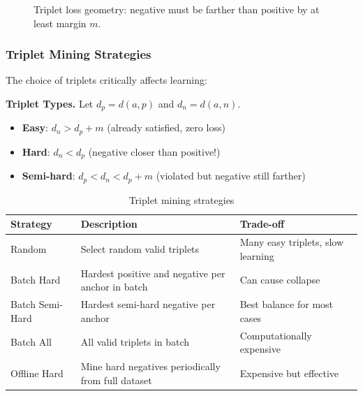 \begin{figure}[H]
\centering
{}
\caption{Triplet loss geometry: negative must be farther than positive by at least margin $m$.}
\end{figure}

\subsubsection{Triplet Mining Strategies}

The choice of triplets critically affects learning:

\textbf{Triplet Types.} Let $d_p = d(a, p)$ and $d_n = d(a, n)$.
\begin{itemize}
    \item \textbf{Easy}: $d_n > d_p + m$ (already satisfied, zero loss)
    \item \textbf{Hard}: $d_n < d_p$ (negative closer than positive!)
    \item \textbf{Semi-hard}: $d_p < d_n < d_p + m$ (violated but negative still farther)
\end{itemize}

\begin{table}[H]
\centering
\caption{Triplet mining strategies}
\begin{tabularx}{\textwidth}{lXX}
\toprule
\textbf{Strategy} & \textbf{Description} & \textbf{Trade-off} \\
\midrule
Random & Select random valid triplets & Many easy triplets, slow learning \\
Batch Hard & Hardest positive and negative per anchor in batch & Can cause collapse \\
Batch Semi-Hard & Hardest semi-hard negative per anchor & Best balance for most cases \\
Batch All & All valid triplets in batch & Computationally expensive \\
Offline Hard & Mine hard negatives periodically from full dataset & Expensive but effective \\
\bottomrule
\end{tabularx}
\end{table}

